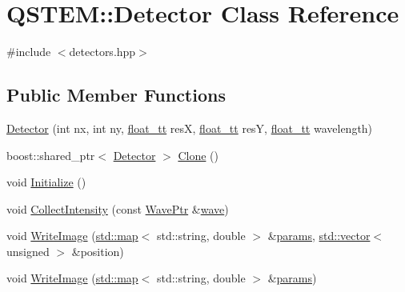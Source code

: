 \hypertarget{class_q_s_t_e_m_1_1_detector}{\section{Q\-S\-T\-E\-M\-:\-:Detector Class Reference}
\label{class_q_s_t_e_m_1_1_detector}
}


{\ttfamily \#include $<$detectors.\-hpp$>$}

\subsection*{Public Member Functions}
\begin{DoxyCompactItemize}
\item 
\hyperlink{class_q_s_t_e_m_1_1_detector_a826744d03916aa79fbc8be2187bbd716}{Detector} (int nx, int ny, \hyperlink{namespace_q_s_t_e_m_a915d7caa497280d9f927c4ce8d330e47}{float\-\_\-tt} res\-X, \hyperlink{namespace_q_s_t_e_m_a915d7caa497280d9f927c4ce8d330e47}{float\-\_\-tt} res\-Y, \hyperlink{namespace_q_s_t_e_m_a915d7caa497280d9f927c4ce8d330e47}{float\-\_\-tt} wavelength)
\item 
boost\-::shared\-\_\-ptr$<$ \hyperlink{class_q_s_t_e_m_1_1_detector}{Detector} $>$ \hyperlink{class_q_s_t_e_m_1_1_detector_aff73a0e23b0822a6be796306739008b3}{Clone} ()
\item 
void \hyperlink{class_q_s_t_e_m_1_1_detector_ad39b5890d63aee7d3ca04c5dd0684236}{Initialize} ()
\item 
void \hyperlink{class_q_s_t_e_m_1_1_detector_a9cbf91aa7db8d072bc5369516a092853}{Collect\-Intensity} (const \hyperlink{namespace_q_s_t_e_m_ab42c5fe058973736465964e84b504b74}{Wave\-Ptr} \&\hyperlink{sim_image_from_wave_8m_acb3ac767ec1048cf315487da2b577ca4}{wave})
\item 
void \hyperlink{class_q_s_t_e_m_1_1_detector_a02fc026c4070ad9962877e13e48c67e9}{Write\-Image} (\hyperlink{_displacement_params_8m_af619c74fd72bdb64d115463dff2720cd}{std\-::map}$<$ std\-::string, double $>$ \&\hyperlink{image_sim_8m_ad57b218fb254a1624c09ad71cb6b6415}{params}, \hyperlink{qmb_8m_af54b69a32590de218622e869b06b47b3}{std\-::vector}$<$ unsigned $>$ \&position)
\item 
void \hyperlink{class_q_s_t_e_m_1_1_detector_a46a331a947c92e45076a28b036a1aebb}{Write\-Image} (\hyperlink{_displacement_params_8m_af619c74fd72bdb64d115463dff2720cd}{std\-::map}$<$ std\-::string, double $>$ \&\hyperlink{image_sim_8m_ad57b218fb254a1624c09ad71cb6b6415}{params})
\end{DoxyCompactItemize}
